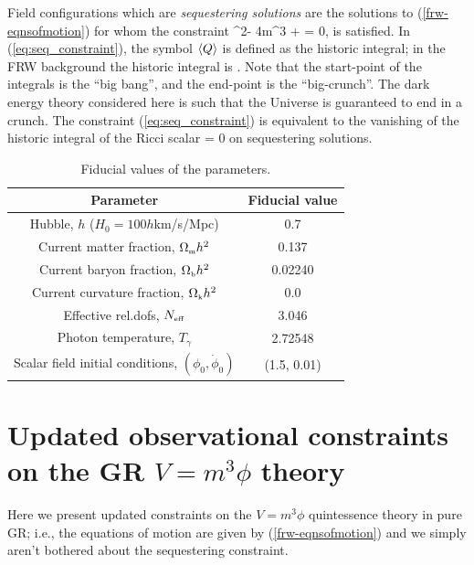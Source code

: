 \documentclass[amsmath,amssymb,10pt,twocolumn,eqsecnum]{revtex4}
\begin{document}
Field configurations which are \textit{sequestering solutions} are the solutions to (\ref{frw-eqnsofmotion}) for whom the constraint
\bea
\label{eq:seq_constraint}
\langle\dot{\phi}^2\rangle - 4m^3 \expec{\phi} +  = 0,
\eea
is satisfied. In (\ref{eq:seq_constraint}), the symbol $\left\langle Q\right\rangle$ is defined as the historic integral; in the FRW background the historic integral is
\bea
{}  {}.
\eea
Note that the start-point of the integrals is the ``big bang'', and the end-point is the ``big-crunch''. The dark energy theory considered here is such that the Universe is guaranteed to end in a crunch. The constraint (\ref{eq:seq_constraint}) is equivalent to  the vanishing of the historic integral of the Ricci scalar
\bea
\label{eq:vanish_R}
 = 0
\eea
on sequestering solutions.




 
 

{\renewcommand{\arraystretch}{1.4}
\begin{table}%
\begin{center}
\begin{tabular}{||c |  c ||}
\hline
\textbf{Parameter} & \textbf{Fiducial value} \\
\hline
Hubble, $h$ ($H_0 = 100h$km/s/Mpc) & 0.7 \\\hline
Current matter fraction, ${\Omega}_{\scriptscriptstyle{\textrm{m}}}h^2$ &0.137  \\\hline
Current baryon fraction, ${\Omega}_{\scriptscriptstyle{\textrm{b}}}h^2$ &0.02240  \\\hline
Current curvature fraction, ${\Omega}_{\scriptscriptstyle{\textrm{k}}}h^2$ &0.0 \\\hline
Effective rel.dofs, ${N}_{\scriptscriptstyle{\textrm{eff}}}$ &3.046 \\\hline
Photon temperature, $T_{\gamma}$ & 2.72548 \\\hline\hline
Scalar field initial conditions, $(\phi_0, \dot{\phi}_0)$ &(1.5, 0.01) \\\hline
\end{tabular}\caption{Fiducial values of the parameters.}\label{tab:fid_params}
\end{center}
\end{table}
}

 
\section{Updated observational constraints on the GR $V = m^3\phi$ theory}
Here we present updated constraints on the  $V = m^3\phi$ quintessence theory in pure GR; i.e., the equations of motion are given by (\ref{frw-eqnsofmotion}) and we simply aren't bothered about the sequestering constraint.
\end{document}
